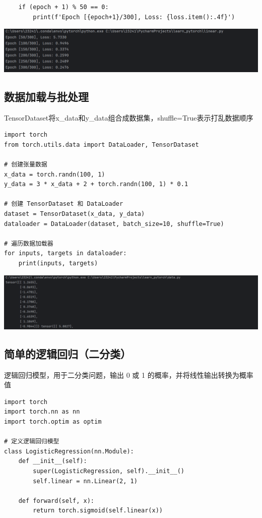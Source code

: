 \documentclass[UTF8,a4paper]{ctexart}
\begin{document}
\begin{sloppypar}
\begin{lstlisting}
    if (epoch + 1) % 50 == 0:
        print(f'Epoch [{epoch+1}/300], Loss: {loss.item():.4f}')
    \end{lstlisting}
	
	\includegraphics[width = 16cm]{15}
	
	\subsection{数据加载与批处理}
	TensorDataset将x\_data和y\_data组合成数据集，shuffle=True表示打乱数据顺序
	\begin{lstlisting}
import torch
from torch.utils.data import DataLoader, TensorDataset

# 创建张量数据
x_data = torch.randn(100, 1)
y_data = 3 * x_data + 2 + torch.randn(100, 1) * 0.1

# 创建 TensorDataset 和 DataLoader
dataset = TensorDataset(x_data, y_data)
dataloader = DataLoader(dataset, batch_size=10, shuffle=True)

# 遍历数据加载器
for inputs, targets in dataloader:
    print(inputs, targets)
    \end{lstlisting}
	
	\includegraphics[width = 16cm]{16}
	
	\subsection{简单的逻辑回归（二分类）}
	逻辑回归模型，用于二分类问题，输出 0 或 1 的概率，并将线性输出转换为概率值
	\begin{lstlisting}
import torch
import torch.nn as nn
import torch.optim as optim

# 定义逻辑回归模型
class LogisticRegression(nn.Module):
    def __init__(self):
        super(LogisticRegression, self).__init__()
        self.linear = nn.Linear(2, 1)

    def forward(self, x):
        return torch.sigmoid(self.linear(x))


\end{lstlisting}
\end{sloppypar}
\end{document}
